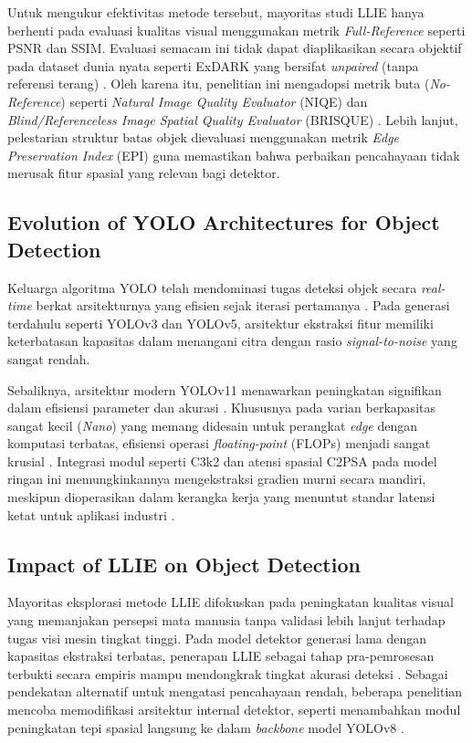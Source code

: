 \documentclass[conference]{IEEEtran}
\begin{document}
Untuk mengukur efektivitas metode tersebut, mayoritas studi LLIE hanya berhenti pada evaluasi kualitas visual menggunakan metrik \textit{Full-Reference} seperti PSNR dan SSIM. Evaluasi semacam ini tidak dapat diaplikasikan secara objektif pada dataset dunia nyata seperti ExDARK yang bersifat \textit{unpaired} (tanpa referensi terang) \cite{loh2019exdark,liu2021benchmark}. Oleh karena itu, penelitian ini mengadopsi metrik buta (\textit{No-Reference}) seperti \textit{Natural Image Quality Evaluator} (NIQE) \cite{mittal2013niqe} dan \textit{Blind/Referenceless Image Spatial Quality Evaluator} (BRISQUE) \cite{mittal2012brisque}. Lebih lanjut, pelestarian struktur batas objek dievaluasi menggunakan metrik \textit{Edge Preservation Index} (EPI) guna memastikan bahwa perbaikan pencahayaan tidak merusak fitur spasial yang relevan bagi detektor.

\subsection{Evolution of YOLO Architectures for Object Detection} 
Keluarga algoritma YOLO telah mendominasi tugas deteksi objek secara \textit{real-time} berkat arsitekturnya yang efisien sejak iterasi pertamanya \cite{redmon2016yolo,terven2023yoloreview}. Pada generasi terdahulu seperti YOLOv3 dan YOLOv5, arsitektur ekstraksi fitur memiliki keterbatasan kapasitas dalam menangani citra dengan rasio \textit{signal-to-noise} yang sangat rendah. 

Sebaliknya, arsitektur modern YOLOv11 menawarkan peningkatan signifikan dalam efisiensi parameter dan akurasi \cite{khanam2024yolov11}. Khususnya pada varian berkapasitas sangat kecil (\textit{Nano}) yang memang didesain untuk perangkat \textit{edge} dengan komputasi terbatas, efisiensi operasi \textit{floating-point} (FLOPs) menjadi sangat krusial \cite{akavaram2025flops,dobrzycki2025freezing}. Integrasi modul seperti C3k2 dan atensi spasial C2PSA pada model ringan ini memungkinkannya mengekstraksi gradien murni secara mandiri, meskipun dioperasikan dalam kerangka kerja yang menuntut standar latensi ketat untuk aplikasi industri \cite{liang2022edgeyolo}.

\subsection{Impact of LLIE on Object Detection} 
Mayoritas eksplorasi metode LLIE difokuskan pada peningkatan kualitas visual yang memanjakan persepsi mata manusia tanpa validasi lebih lanjut terhadap tugas visi mesin tingkat tinggi. Pada model detektor generasi lama dengan kapasitas ekstraksi terbatas, penerapan LLIE sebagai tahap pra-pemrosesan terbukti secara empiris mampu mendongkrak tingkat akurasi deteksi \cite{wang2023yolov5lowlight,shovo2024lowlight}. Sebagai pendekatan alternatif untuk mengatasi pencahayaan rendah, beberapa penelitian mencoba memodifikasi arsitektur internal detektor, seperti menambahkan modul peningkatan tepi spasial langsung ke dalam \textit{backbone} model YOLOv8 \cite{gong2025multiscale}.
\end{document}
